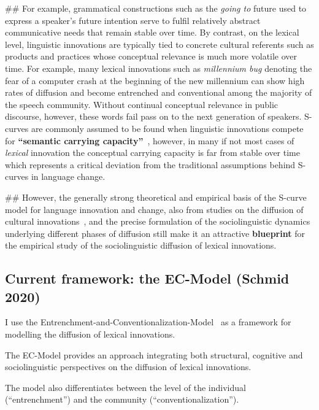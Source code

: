 \documentclass[
  a4paper,
  abstract=on,
  captions=tableabove
  ]{scrartcl}
\renewcommand{\hw}[1]{\textbf{#1}}
\begin{document}
\begin{easylist}[itemize]
  ## For example, grammatical constructions such as the \emph{going to} future used to express a speaker's future intention serve to fulfil relatively abstract communicative needs that remain stable over time. By contrast, on the lexical level, linguistic innovations are typically tied to concrete cultural referents such as products and practices whose conceptual relevance is much more volatile over time. For example, many lexical innovations such as \emph{millennium bug} denoting the fear of a computer crash at the beginning of the new millennium can show high rates of diffusion and become entrenched and conventional among the majority of the speech community. Without continual conceptual relevance in public discourse, however, these words fail pass on to the next generation of speakers. S-curves are commonly assumed to be found when linguistic innovations compete for \hw{\enquote{semantic carrying capacity}}~\parencite{Nini2017ApplicationGrowth}, however, in many if not most cases of \emph{lexical} innovation the conceptual carrying capacity is far from stable over time which represents a critical deviation from the traditional assumptions behind S-curves in language change.

  ## However, the generally strong theoretical and empirical basis of the S-curve model for language innovation and change, also from studies on the diffusion of cultural innovations~\parencite{Rogers1962DiffusionInnovations}, and the precise formulation of the sociolinguistic dynamics underlying different phases of diffusion still make it an attractive \hw{blueprint} for the empirical study of the sociolinguistic diffusion of lexical innovations.

  \end{easylist}


  \subsection{Current framework: the EC-Model (Schmid 2020)}
    \label{subsec:ec-model}

  I use the Entrenchment-and-Conventionalization-Model~\parencite{Schmid2020DynamicsLinguistic} as a framework for modelling the diffusion of lexical innovations.

  The EC-Model provides an approach integrating both structural, cognitive and sociolinguistic perspectives on the diffusion of lexical innovations.

  The model also differentiates between the level of the individual (\enquote{entrenchment}) and the community (\enquote{conventionalization}).
\end{document}
